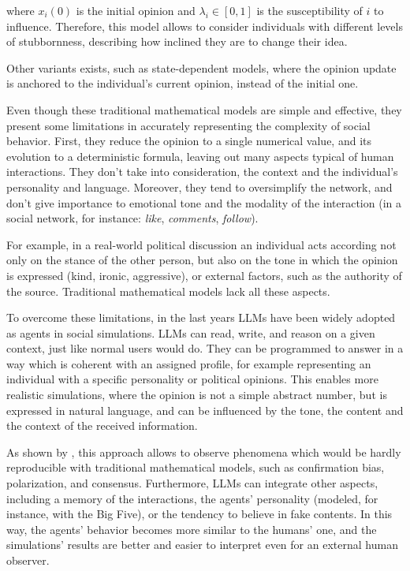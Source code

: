 where $x_i(0)$ is the initial opinion and $\lambda_i \in [0, 1]$ is the susceptibility of $i$ to influence.
Therefore, this model allows to consider individuals with different levels of stubbornness, describing how inclined they are to change their idea.

Other variants exists, such as state-dependent models, where the opinion update is anchored to the individual's current opinion, instead of the initial one.


\medskip
Even though these traditional mathematical models are simple and effective, they present some limitations in accurately representing the complexity of social behavior.
First, they reduce the opinion to a single numerical value, and its evolution to a deterministic formula, leaving out many aspects typical of human interactions.
They don't take into consideration, the context and the individual's personality and language.
Moreover, they tend to oversimplify the network, and don't give importance to emotional tone and the modality of the interaction (in a social network, for instance: \textit{like}, \textit{comments}, \textit{follow}).

For example, in a real-world political discussion an individual acts according not only on the stance of the other person, but also on the tone in which the opinion is expressed (kind, ironic, aggressive), or external factors, such as the authority of the source.
Traditional mathematical models lack all these aspects.


\medskip
To overcome these limitations, in the last years LLMs have been widely adopted as agents in social simulations.
LLMs can read, write, and reason on a given context, just like normal users would do.
They can be programmed to answer in a way which is coherent with an assigned profile, for example representing an individual with a specific personality or political opinions.
This enables more realistic simulations, where the opinion is not a simple abstract number, but is expressed in natural language, and can be influenced by the tone, the content and the context of the received information.

\medskip
As shown by \citet{chuang2024simulatingopiniondynamicsnetworks, cau2025languagedrivenopiniondynamicsagentbased, piao2025emergencehumanlikepolarizationlarge}, this approach allows to observe phenomena which would be hardly reproducible with traditional mathematical models, such as confirmation bias, polarization, and consensus.
Furthermore, LLMs can integrate other aspects, including a memory of the interactions, the agents' personality (modeled, for instance, with the Big Five), or the tendency to believe in fake contents.
In this way, the agents' behavior becomes more similar to the humans' one, and the simulations' results are better and easier to interpret even for an external human observer.

